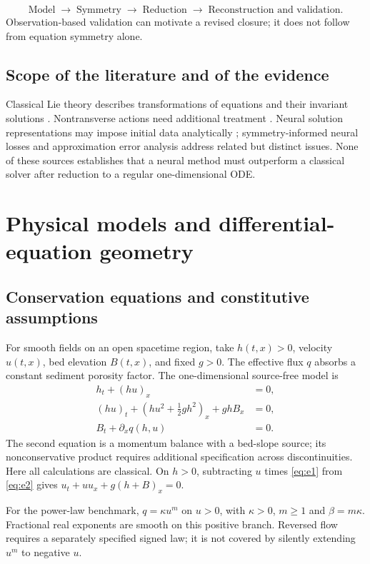 \documentclass[11pt,a4paper,oneside]{report}
\numberwithin{equation}{chapter}
\begin{document}
\begin{equation*}
\text{Model}\;\longrightarrow\;\text{Symmetry}\;\longrightarrow\;\text{Reduction}
\;\longrightarrow\;\text{Reconstruction and validation}.
\end{equation*}
Observation-based validation can motivate a revised closure; it does not follow from equation symmetry alone.


\section{Scope of the literature and of the evidence}
Classical Lie theory describes transformations of equations and their invariant solutions \cite{olver,oliveri2026}. Nontransverse actions need additional treatment \cite{anderson2000}. Neural solution representations may impose initial data analytically \cite{lagaris}; symmetry-informed neural losses \cite{sympinn} and approximation error analysis \cite{mishra2023} address related but distinct issues. None of these sources establishes that a neural method must outperform a classical solver after reduction to a regular one-dimensional ODE.

\chapter{Physical models and differential-equation geometry}\label{ch:models}
\section{Conservation equations and constitutive assumptions}
For smooth fields on an open spacetime region, take $h(t,x)>0$, velocity $u(t,x)$, bed elevation $B(t,x)$, and fixed $g>0$. The effective flux $q$ absorbs a constant sediment porosity factor. The one-dimensional source-free model is
\begin{align}
h_t+(hu)_x&=0,\label{eq:e1}\\
(hu)_t+(hu^2+\tfrac12gh^2)_x+ghB_x&=0,\label{eq:e2}\\
B_t+\partial_xq(h,u)&=0.\label{eq:e3}
\end{align}
The second equation is a momentum balance with a bed-slope source; its nonconservative product requires additional specification across discontinuities. Here all calculations are classical. On $h>0$, subtracting $u$ times \eqref{eq:e1} from \eqref{eq:e2} gives $u_t+uu_x+g(h+B)_x=0$.

For the power-law benchmark, $q=\kappa u^m$ on $u>0$, with $\kappa>0$, $m\ge1$ and $\beta=m\kappa$. Fractional real exponents are smooth on this positive branch. Reversed flow requires a separately specified signed law; it is not covered by silently extending $u^m$ to negative $u$.
\end{document}
